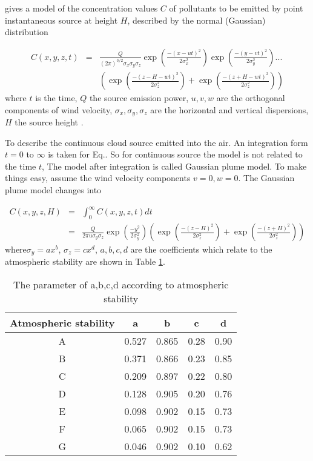 \cite{N.Kh.2004} gives a model of the concentration values $C$ of
pollutants to be emitted by point instantaneous source at height $H$,
described by the normal (Gaussian) distribution 

\begin{eqnarray}
C(x,y,z,t) & = & \frac{Q}{(2\pi)^{3/2}\sigma_{x}\sigma_{y}\sigma_{z}}\exp\left(\tfrac{-\left(x-ut\right)^{2}}{2\sigma_{x}^{2}}\right)\exp\left(\tfrac{-\left(y-vt\right)^{2}}{2\sigma_{y}^{2}}\right)...\label{eq:Point source concentration}\\
 &  & \left(\exp\left(\tfrac{-\left(z-H-wt\right)^{2}}{2\sigma_{z}^{2}}\right)+\exp\left(\tfrac{-\left(z+H-wt\right)^{2}}{2\sigma_{z}^{2}}\right)\right)
\end{eqnarray}
where $t$ is the time, $Q$ the source emission power, $u,v,w$ are
the orthogonal components of wind velocity, $\sigma_{x},\sigma_{y},\sigma_{z}$
are the horizontal and vertical dispersions, $H$ the source height
. 

To describe the continuous cloud source emitted into the air. An integration
form $t=0$ to $\infty$ is taken for Eq..
So for continuous source the model is not related to the time $t$,
 The model after integration is called Gaussian plume model. To make
things easy, assume the wind velocity components $v=0,w=0$. The Gaussian
plume model changes into

\begin{eqnarray}
C(x,y,z,H) & = & \int_{0}^{\infty}C(x,y,z,t)dt\label{eq:Continous source C}\\
 & = & \frac{Q}{2\pi u\sigma_{y}\sigma_{z}}\exp\left(\tfrac{-y^{2}}{2\sigma_{y}^{2}}\right)\left(\exp\left(\tfrac{-\left(z-H\right)^{2}}{2\sigma_{z}^{2}}\right)+\exp\left(\tfrac{-\left(z+H\right)^{2}}{2\sigma_{z}^{2}}\right)\right)\nonumber 
\end{eqnarray}
where$\sigma_{y}=ax^{b}$, $\sigma_{z}=cx^{d}$, $a,b,c,d$ are the
coefficients which relate to the atmospheric stability are shown in
Table \ref{tab:The-parameter-of}.



\begin{table}
\caption{\label{tab:The-parameter-of}The parameter of a,b,c,d according to
atmospheric stability}
\hfill{}%
\begin{tabular}{|c|c|c|c|c|}
\hline 
Atmospheric stability  & a & b & c & d\tabularnewline
\hline 
\hline 
A & 0.527 & 0.865 & 0.28 & 0.90\tabularnewline
\hline 
B & 0.371 & 0.866 & 0.23 & 0.85\tabularnewline
\hline 
C & 0.209 & 0.897 & 0.22 & 0.80\tabularnewline
\hline 
D & 0.128 & 0.905 & 0.20 & 0.76\tabularnewline
\hline 
E & 0.098 & 0.902 & 0.15 & 0.73\tabularnewline
\hline 
F & 0.065 & 0.902 & 0.15 & 0.73\tabularnewline
\hline 
G & 0.046 & 0.902 & 0.10 & 0.62\tabularnewline
\hline 
\end{tabular}\hfill{}
\end{table}


